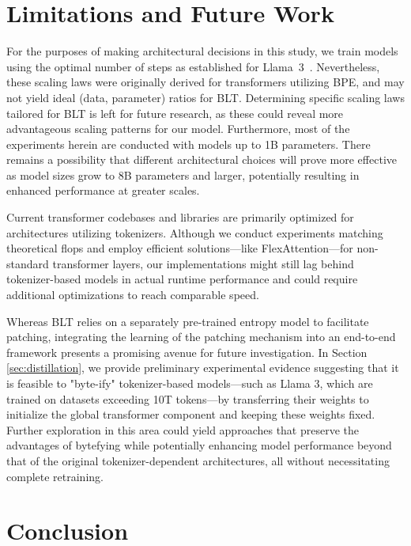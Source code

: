 \section{Limitations and Future Work}

For the purposes of making architectural decisions in this study, we train models using the optimal number of steps as established for Llama~3~\citep{dubey2024llama}. Nevertheless, these scaling laws were originally derived for transformers utilizing BPE, and may not yield ideal (data, parameter) ratios for {\textsc BLT}. Determining specific scaling laws tailored for {\textsc BLT} is left for future research, as these could reveal more advantageous scaling patterns for our model. Furthermore, most of the experiments herein are conducted with models up to 1B parameters. There remains a possibility that different architectural choices will prove more effective as model sizes grow to 8B parameters and larger, potentially resulting in enhanced performance at greater scales.

Current transformer codebases and libraries are primarily optimized for architectures utilizing tokenizers. Although we conduct experiments matching theoretical flops and employ efficient solutions—like FlexAttention—for non-standard transformer layers, our implementations might still lag behind tokenizer-based models in actual runtime performance and could require additional optimizations to reach comparable speed.

Whereas {\textsc BLT} relies on a separately pre-trained entropy model to facilitate patching, integrating the learning of the patching mechanism into an end-to-end framework presents a promising avenue for future investigation. In Section \ref{sec:distillation}, we provide preliminary experimental evidence suggesting that it is feasible to "byte-ify" tokenizer-based models—such as Llama 3, which are trained on datasets exceeding 10T tokens—by transferring their weights to initialize the global transformer component and keeping these weights fixed. Further exploration in this area could yield approaches that preserve the advantages of bytefying while potentially enhancing model performance beyond that of the original tokenizer-dependent architectures, all without necessitating complete retraining.

\section{Conclusion}
\label{section:conclusion}

